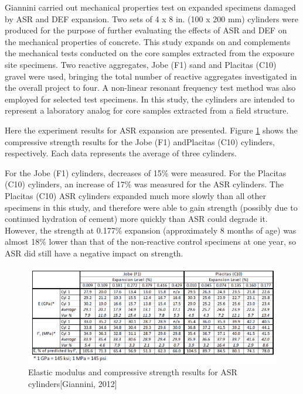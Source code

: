 \clearpage

Giannini carried out mechanical properties test on expanded specimens damaged by ASR and DEF expansion. Two sets of 4 x 8 in. (100 x 200 mm) cylinders were produced for the purpose of further evaluating the effects of ASR and DEF on the mechanical properties of concrete. This study expands on and complements the mechanical tests conducted on the core samples extracted from the exposure site specimens. Two reactive aggregates, Jobe (F1) sand and Placitas (C10) gravel were used, bringing the total number of reactive aggregates investigated in the overall project to four. A non-linear resonant frequency test method was also employed for selected test specimens. In this study, the cylinders are intended to represent a laboratory analog for core samples extracted from a field structure.

Here the experiment results for ASR expansion are presented. Figure \ref{Giannini, 2012} shows the compressive strength results for the Jobe (F1) andPlacitas (C10) cylinders, respectively. Each data represents the average of three cylinders.

For the Jobe (F1) cylinders, decreases of 15\% were measured. For the Placitas (C10) cylinders, an increase of 17\% was measured for the ASR cylinders. The Placitas (C10) ASR cylinders expanded much more slowly than all other specimens in this study, and therefore were able to gain strength (possibly due to continued hydration of cement) more quickly than ASR could degrade it. However, the strength at 0.177\% expansion (approximately 8 months of age) was almost 18\% lower than that of the non-reactive control specimens at one year, so ASR did still have a negative impact on strength.

\begin{figure}[h!]
  \centering
  \includegraphics[width=0.8\linewidth]{Reference/GIANNINIASR.png}
  \caption{Elastic modulus and compressive strength results for ASR cylinders[Giannini, 2012]}
  \label{Giannini, 2012}
\end{figure}

